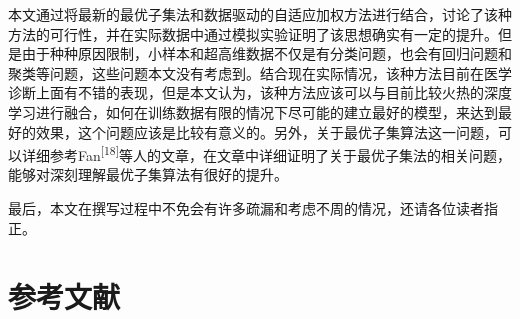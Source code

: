 \documentclass[
]{ctexart}
\begin{document}
本文通过将最新的最优子集法和数据驱动的自适应加权方法进行结合，讨论了该种方法的可行性，并在实际数据中通过模拟实验证明了该思想确实有一定的提升。但是由于种种原因限制，小样本和超高维数据不仅是有分类问题，也会有回归问题和聚类等问题，这些问题本文没有考虑到。结合现在实际情况，该种方法目前在医学诊断上面有不错的表现，但是本文认为，该种方法应该可以与目前比较火热的深度学习进行融合，如何在训练数据有限的情况下尽可能的建立最好的模型，来达到最好的效果，这个问题应该是比较有意义的。另外，关于最优子集算法这一问题，可以详细参考Fan\textsuperscript{{[}18{]}}等人的文章，在文章中详细证明了关于最优子集法的相关问题，能够对深刻理解最优子集算法有很好的提升。

最后，本文在撰写过程中不免会有许多疏漏和考虑不周的情况，还请各位读者指正。

\hypertarget{ux53c2ux8003ux6587ux732e}{%
\section*{参考文献}\label{ux53c2ux8003ux6587ux732e}}
\end{document}
